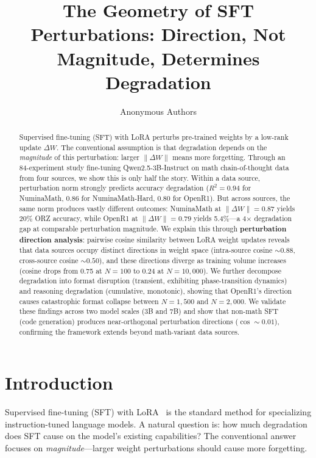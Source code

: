 \documentclass{article}
\title{The Geometry of SFT Perturbations: Direction, Not Magnitude, Determines Degradation}
\author{
  Anonymous Authors
}
\begin{document}
\maketitle

\begin{abstract}
Supervised fine-tuning (SFT) with LoRA perturbs pre-trained weights by a low-rank update $\Delta W$. The conventional assumption is that degradation depends on the \emph{magnitude} of this perturbation: larger $\|\Delta W\|$ means more forgetting. Through an 84-experiment study fine-tuning Qwen2.5-3B-Instruct on math chain-of-thought data from four sources, we show this is only half the story. Within a data source, perturbation norm strongly predicts accuracy degradation ($R^2 = 0.94$ for NuminaMath, $0.86$ for NuminaMath-Hard, $0.80$ for OpenR1). But across sources, the same norm produces vastly different outcomes: NuminaMath at $\|\Delta W\| = 0.87$ yields 20\% ORZ accuracy, while OpenR1 at $\|\Delta W\| = 0.79$ yields 5.4\%---a 4$\times$ degradation gap at comparable perturbation magnitude. We explain this through \textbf{perturbation direction analysis}: pairwise cosine similarity between LoRA weight updates reveals that data sources occupy distinct directions in weight space (intra-source cosine ${\sim}0.88$, cross-source cosine ${\sim}0.50$), and these directions diverge as training volume increases (cosine drops from 0.75 at $N{=}100$ to 0.24 at $N{=}10{,}000$). We further decompose degradation into format disruption (transient, exhibiting phase-transition dynamics) and reasoning degradation (cumulative, monotonic), showing that OpenR1's direction causes catastrophic format collapse between $N{=}1{,}500$ and $N{=}2{,}000$. We validate these findings across two model scales (3B and 7B) and show that non-math SFT (code generation) produces near-orthogonal perturbation directions ($\cos{\sim}0.01$), confirming the framework extends beyond math-variant data sources.
\end{abstract}

\section{Introduction}

Supervised fine-tuning (SFT) with LoRA~\citep{hu2022lora} is the standard method for specializing instruction-tuned language models. A natural question is: how much degradation does SFT cause on the model's existing capabilities? The conventional answer focuses on \emph{magnitude}---larger weight perturbations should cause more forgetting.
\end{document}
